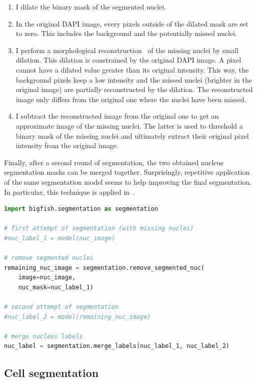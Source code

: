 \begin{enumerate}
	\setlength\itemsep{0.1em}
	\item I dilate the binary mask of the segmented nuclei.
	\item In the original DAPI image, every pixels outside of the dilated mask are set to zero.
	This includes the background and the potentially missed nuclei.
	\item I perform a morphological reconstruction~\cite{Robinson_2004} of the missing nuclei by small dilation.
	This dilation is constrained by the original DAPI image.
	A pixel cannot have a dilated value greater than its original intensity.
	This way, the background pixels keep a low intensity and the missed nuclei (brighter in the original image) are partially reconstructed by the dilation.
	The reconstructed image only differs from the original one where the nuclei have been missed.
	\item I subtract the reconstructed image from the original one to get an approximate image of the missing nuclei.
	The latter is used to threshold a binary mask of the missing nuclei and ultimately extract their original pixel intensity from the original image.
\end{enumerate}

\noindent
Finally, after a second round of segmentation, the two obtained nucleus segmentation masks can be merged together.
Surprisingly, repetitive application of the same segmentation model seems to help improving the final segmentation.
In particular, this technique is applied in~\cite{CHOUAIB_2020}.\\

\begin{minipage}{0.9\textwidth}
\begin{lstlisting}[language=Python]
import bigfish.segmentation as segmentation

# first attempt of segmentation (with missing nuclei)
#nuc_label_1 = model(nuc_image)

# remove segmented nuclei
remaining_nuc_image = segmentation.remove_segmented_nuc(
	image=nuc_image,
	nuc_mask=nuc_label_1)

# second attempt of segmentation
#nuc_label_2 = model(remaining_nuc_image)

# merge nucleus labels
nuc_label = segmentation.merge_labels(nuc_label_1, nuc_label_2)
\end{lstlisting}
\end{minipage}

\subsection{Cell segmentation}
\label{subsec:segmentation_cell}

